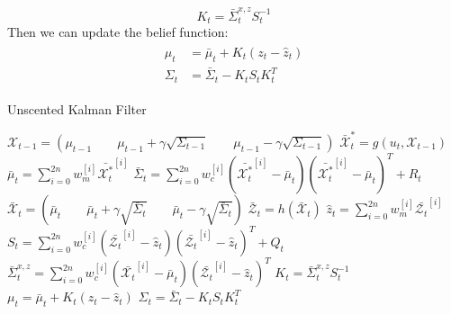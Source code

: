 \documentclass[twoside]{article}
\begin{document}
\begin{equation}
K_t = \bar{\Sigma}_t^{x,z}S_t^{-1}
\end{equation}
Then we can update the belief function:
\begin{align}
\begin{split}
\mu_t &= \bar{\mu}_t + K_t(z_t - \hat{z}_t) \\
\Sigma_t &= \bar{\Sigma}_t  - K_t S_t K_t^T
\end{split}
\end{align}

\begin{algorithm}[H]
\caption{Unscented Kalman Filter}
$ \mathcal{X}_{t-1} = \left(\mu_{t-1} \qquad \mu_{t-1} + \gamma \sqrt{\Sigma_{t-1}}\qquad \mu_{t-1} - \gamma \sqrt{\Sigma_{t-1}}\right)$ \;
$\bar{\mathcal{X}}^*_t = g(u_t, \mathcal{X}_{t-1})$ \;
$\bar{\mu}_t = \sum_{i=0}^{2n} w_m^{[i]}\bar{\mathcal{X}_t^*}^{[i]}$ \;
$\bar{\Sigma}_t = \sum_{i=0}^{2n} w_c^{[i]}\left(\bar{\mathcal{X}_t^*}^{[i]} -\bar{\mu}_t\right)\left(\bar{\mathcal{X}_t^*}^{[i]} -\bar{\mu}_t\right)^T + R_t$ \;
$ \bar{\mathcal{X}}_{t} = \left(\bar{\mu}_{t} \qquad \bar{\mu}_{t}  + \gamma \sqrt{\bar{\Sigma}_t}\qquad \bar{\mu}_{t}  - \gamma \sqrt{\bar{\Sigma}_t}\right)$ \;
$\bar{\mathcal{Z}}_t = h(\bar{\mathcal{X}}_t)$\;
$\hat{z}_t =  \sum_{i=0}^{2n} w_m^{[i]}\bar{\mathcal{Z}_t}^{[i]}$ \;
$S_t = \sum_{i=0}^{2n} w_c^{[i]}\left(\bar{\mathcal{Z}_t}^{[i]} -\hat{z}_t\right)\left(\bar{\mathcal{Z}_t}^{[i]} -\hat{z}_t\right)^T + Q_t$ \;
$\bar{\Sigma}_t^{x,z} = \sum_{i=0}^{2n} w_c^{[i]}\left(\bar{\mathcal{X}_t}^{[i]} -\bar{\mu}_t\right)\left(\bar{\mathcal{Z}_t}^{[i]} -\hat{z}_t\right)^T$ \;
$K_t = \bar{\Sigma}_t^{x,z}S_t^{-1}$ \;
$ \mu_t = \bar{\mu}_t + K_t(z_t - \hat{z}_t)$ \;
$\Sigma_t = \bar{\Sigma}_t  - K_t S_t K_t^T$ \;
\label{UKF_ALG}
\end{algorithm}
\end{document}
